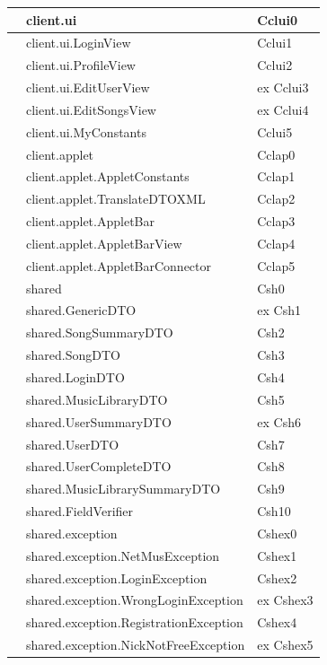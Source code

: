 \begin{footnotesize}
\begin{longtable}[h]{|l|l|l|}
& client.ui  &  Cclui0 \\\hline 
& client.ui.LoginView  &  Cclui1 \\\hline 
& client.ui.ProfileView  &  Cclui2 \\\hline 
\bo{--} & client.ui.EditUserView  &  ex Cclui3 \\\hline 
\bo{--} & client.ui.EditSongsView  &  ex Cclui4 \\\hline 
\bo{+} & client.ui.MyConstants  &  Cclui5 \\\hline  
& client.applet  &  Cclap0  \\\hline 
\bo{+} & client.applet.AppletConstants  &  Cclap1 \\\hline 
\bo{+} & client.applet.TranslateDTOXML  &  Cclap2  \\\hline 
\bo{+} & client.applet.AppletBar  &  Cclap3  \\\hline 
\bo{+} & client.applet.AppletBarView  &  Cclap4  \\\hline 
\bo{+} & client.applet.AppletBarConnector  &  Cclap5  \\\hline 
& shared  &  Csh0 \\\hline 
\bo{--} & shared.GenericDTO  &  ex Csh1 \\\hline 
& shared.SongSummaryDTO  &  Csh2 \\\hline 
& shared.SongDTO  &  Csh3 \\\hline 
& shared.LoginDTO  &  Csh4 \\\hline 
& shared.MusicLibraryDTO  &  Csh5 \\\hline 
\bo{--} & shared.UserSummaryDTO  &  ex Csh6 \\\hline 
& shared.UserDTO  &  Csh7 \\\hline 
& shared.UserCompleteDTO  &  Csh8 \\\hline 
\bo{+} & shared.MusicLibrarySummaryDTO  &  Csh9 \\\hline 
\bo{+} & shared.FieldVerifier  &  Csh10 \\\hline 
& shared.exception  &  Cshex0 \\\hline 
& shared.exception.NetMusException  &  Cshex1 \\\hline 
& shared.exception.LoginException  &  Cshex2 \\\hline 
\bo{--} & shared.exception.WrongLoginException  &  ex Cshex3 \\\hline 
& shared.exception.RegistrationException  &  Cshex4 \\\hline 
\bo{--} & shared.exception.NickNotFreeException  &  ex Cshex5 \\\hline 

\end{longtable}
\end{footnotesize}
